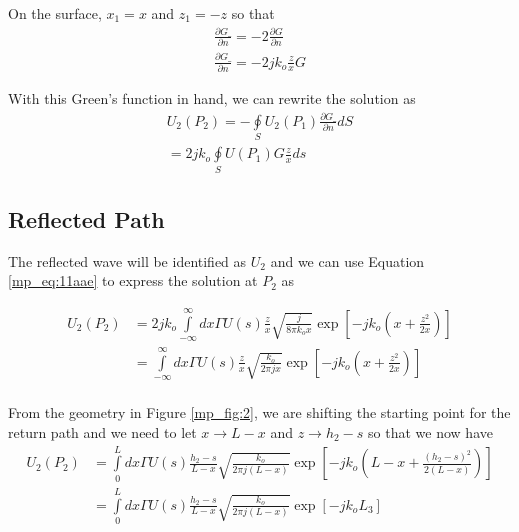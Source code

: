 \noindent On the surface, $x_1 = x$ and $z_1 = -z$ so that
\begin{equation}
\begin{gathered}
\frac{\partial G\_}{\partial n} = -2\frac{\partial G}{\partial n} \\
\frac{\partial G\_}{\partial n} = -2jk_o\frac{z}{x}G
\end{gathered}
\label{mp_eq:11aad}
\end{equation}
\renewcommand{\baselinestretch}{2} \small\normalsize

\noindent With this Green's function in hand, we can rewrite the solution as
\begin{equation}
\begin{gathered}
U_2(P_2) = -\oint\limits_{S}U_2(P_1)\frac{\partial G\_}{\partial n}dS\\
= 2jk_o\oint\limits_{S}U(P_1)G\frac{z}{x}ds
\end{gathered}
\label{mp_eq:11aae}
\end{equation}
\renewcommand{\baselinestretch}{2} \small\normalsize

\subsection{Reflected Path}
The reflected wave will be identified as $U_2$ and we can use Equation \ref{mp_eq:11aae} to express the solution at $P_2$ as

\begin{equation}
\begin{aligned}
U_2(P_2) &= 2jk_o\int\limits_{-\infty}^{\infty}dx\Gamma U(s)\frac{z}{x}\sqrt{\frac{j}{8\pi k_o x}}\exp\left[-jk_o\left(x +\frac{z^2}{2x} \right) \right] \\
&= \int\limits_{-\infty}^{\infty}dx\Gamma U(s)\frac{z}{x}\sqrt{\frac{k_o}{2\pi j x}}\exp\left[-jk_o\left(x +\frac{z^2}{2x} \right) \right] \\
\end{aligned}
\label{mp_eq:11aaf}
\end{equation}
\renewcommand{\baselinestretch}{2} \small\normalsize

From the geometry in Figure \ref{mp_fig:2}, we are shifting the starting point for the return path and we need to let $x \rightarrow L-x$ and $z \rightarrow h_2-s$ so that we now have
\begin{equation}
\begin{aligned}
U_2(P_2) &= \int\limits_{0}^{L}dx\Gamma U(s)\frac{h_2-s}{L-x}\sqrt{\frac{k_o}{2\pi j (L-x)}}\exp\left[-jk_o\left(L-x +\frac{(h_2-s)^2}{2(L-x)} \right) \right] \\
&= \int\limits_{0}^{L}dx\Gamma U(s)\frac{h_2-s}{L-x}\sqrt{\frac{k_o}{2\pi j (L-x)}}\exp\left[-jk_oL_3\right] \\
\end{aligned}
\label{mp_eq:11aag}
\end{equation}
\renewcommand{\baselinestretch}{2} \small\normalsize

